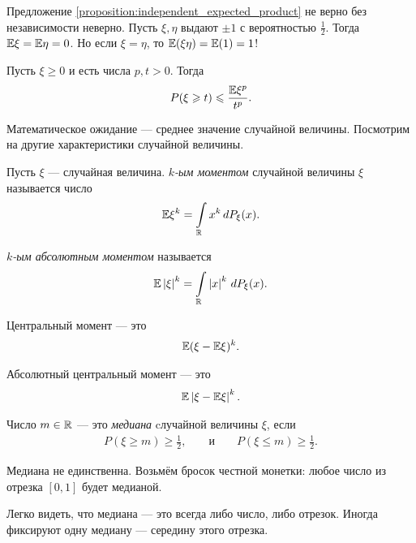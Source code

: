 \documentclass[../main.tex]{subfiles}
\begin{document}
\begin{remrk}
 Предложение \ref{proposition:independent_expected_product} не верно без независимости неверно. Пусть $ \xi, \eta $ выдают $ \pm 1 $ с вероятностью $ \frac{1}{2} $. Тогда $ \mathbb E\xi = \mathbb E\eta = 0 $. Но если $ \xi = \eta $, то $ \mathbb E(\xi\eta) = \mathbb E(1) = 1 $!
\end{remrk}

\begin{prop}
 Пусть $ \xi \geqslant 0 $ и есть числа $ p,t > 0 $. Тогда
  \begin{align}
   \label{equation:markov_inequality}
  P(\xi \geqslant t) \leqslant \frac{\mathbb E \xi^{p}}{t^{p}}.
 \end{align}  
\end{prop}

Математическое ожидание --- среднее значение случайной величины. Посмотрим на другие характеристики случайной величины.

\begin{df}
 Пусть $ \xi $ --- случайная величина. \textit{$ k $-ым моментом} случайной величины $ \xi $ называется число
 \begin{align*}
  \mathbb E \xi^{k} = \int\limits_{\mathbb{R}} x^{k}\,dP_{\xi}(x).
 \end{align*} 

  \textit{$ k $-ым абсолютным моментом} называется
 \begin{align*}
  \mathbb E \left| \xi \right|^{k} = \int\limits_{\mathbb{R}} \left| x \right|^{k}\,dP_{\xi} (x).
 \end{align*} 

 Центральный момент --- это
 \begin{align*}
  \mathbb E (\xi - \mathbb E \xi)^{k}.
 \end{align*} 

 Абсолютный центральный момент --- это
 \begin{align*}
  \mathbb E \left| \xi - \mathbb E \xi \right|^{k}.
 \end{align*} 
\end{df}

\begin{df}
 Число $ m \in\mathbb{R}$ --- это \textit{медиана} cлучайной величины $ \xi $, если
 \begin{align*}
  P(\xi \geqslant m) \geqslant \frac{1}{2}, & &\text{ и } & &P(\xi \leqslant m) \geqslant \frac{1}{2}.
 \end{align*} 
\end{df}
\begin{remrk*}
 Медиана не единственна. Возьмём бросок честной монетки: любое число из отрезка $ [0,1] $ будет медианой.
\end{remrk*}
\begin{remrk*}
 Легко видеть, что медиана --- это всегда либо число, либо отрезок. Иногда фиксируют одну медиану --- середину этого отрезка.
\end{remrk*}
\end{document}
